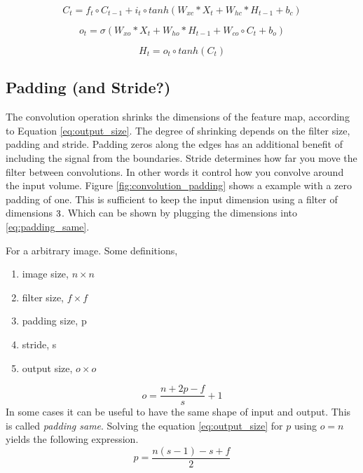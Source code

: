 \begin{equation} \label{eq:CLSTM3_cellstate}
        C_t = f_t \circ C_{t-1} +i_t\circ tanh\left( W_{xc}*X_t + W_{hc}*H_{t-1} + b_c \right)
\end{equation}

\begin{equation} \label{eq:CLSTM4_output_gate}
        o_t = \sigma \left( W_{xo}*X_t + W_{ho}*H_{t-1} + W_{co}\circ C_{t}+b_o \right)
\end{equation}

\begin{equation} \label{eq:CLSTM5_hidden_state}
        H_t = o_t \circ tanh \left( C_t \right)
\end{equation}

\subsection{Padding (and Stride?)} \label{sec:padding}
The convolution operation shrinks the dimensions of the feature map, according to Equation \eqref{eq:output_size}. The degree of shrinking  depends on the  filter size, padding and stride. Padding zeros along the edges has an additional benefit of including the signal from the boundaries. Stride determines how far you move the filter between convolutions. In other words it control how you convolve around the input volume. Figure \ref{fig:convolution_padding} shows a example with a zero padding of one. This is sufficient to keep the input dimension using a filter of dimensions $3 \time 3$. Which can be shown by plugging the dimensions into \eqref{eq:padding_same}.

For a arbitrary image. Some definitions,
\begin{enumerate}
    \item image size, $n\times n$
    \item filter size, $f\times f$
    \item padding size, p
    \item stride, s
    \item output size, $o \times o$
\end{enumerate}

\begin{equation} \label{eq:output_size}
    o = \frac{n+2p-f}{s} + 1
\end{equation}
In some cases it can be useful to have the same shape of input and output. This is called \textit{padding same}. Solving the equation \eqref{eq:output_size} for $p$ using $o=n$ yields the following expression.
\begin{equation} \label{eq:padding_same}
    p = \frac{n\left(s-1\right)-s+f}{2}
\end{equation}

